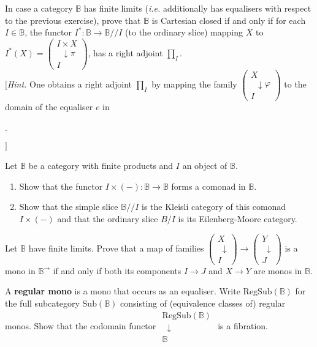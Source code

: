 \documentclass{report}
\newcommand{\bB}[0]{\mathbb B}
\newcommand{\fibcent}[3]{\begin{array}{c}#1 \\[-0.1cm] \;\;\downarrow #2 \\ #3\end{array}}
\newcommand{\dbsl}[0]{/\!\!/}
\newcommand{\Sub}[0]{\mathrm{Sub}}
\begin{document}
\begin{exo}
    In case a category $\bB$ has finite limits (\textit{i.e.} additionally has equalisers with respect to
    the previous exercise), prove that $\bB$ is Cartesian closed if and only if for each $I \in \bB$, the
    functor $I^* : \bB\to\bB\dbsl I$ (to the ordinary slice) mapping $X$ to $I^*(X) =
    \left(\fibcent{I\times X}{\pi}{I}\right)$, has a right adjoint $\prod_I$.\\
    $[$\textit{Hint.} One obtains a right adjoint $\prod_I$ by mapping the family
    $\left(\fibcent{X}{\varphi}{I}\right)$ to the domain of the equaliser $e$ in
    \begin{center}
        .
    \end{center}
    \vspace{-1.58cm}
    \begin{flushright}
        $]$
    \end{flushright}
\end{exo}

\vspace{0.5cm}

\begin{exo}
    Let $\bB$ be a category with finite products and $I$ an object of $\bB$.
    \begin{enumerate}[label=(\roman*)]
        \item Show that the functor $I\times (-) : \bB\to\bB$ forms a comonad in $\bB$.
        \item Show that the simple slice $\bB\dbsl I$ is the Kleisli category of this comonad $I\times(-)$ and
        that the ordinary slice $B/I$ is its Eilenberg-Moore category.
    \end{enumerate}
\end{exo}

\begin{exo}
    Let $\bB$ have finite limits. Prove that a map of families $\left(\fibcent{X}{\!\!}{I}\right)\to
    \left(\fibcent{Y}{\!\!}{J}\right)$ is a mono in $\bB^\to$ if and only if both its components $I\to J$ and
    $X \to Y$ are monos in $\bB$.
\end{exo}

\begin{exo}
    A \textbf{regular mono} is a mono that occurs as an equaliser. Write $\mathrm{RegSub}(\bB)$ for the full
    subcategory $\Sub(\bB)$ consisting of (equivalence classes of) regular monos. Show that the codomain
    functor $\fibcent{\mathrm{RegSub}(\bB)}{\!\!}{\bB}$ is a fibration.
\end{exo}
\end{document}
